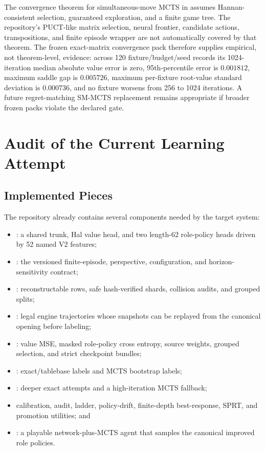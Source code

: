 \documentclass[11pt]{article}
\begin{document}
The convergence theorem for simultaneous-move MCTS in
\cite{lisy2013} assumes Hannan-consistent selection, guaranteed exploration,
and a finite game tree. The repository's PUCT-like matrix selection, neural
frontier, candidate actions, transpositions, and finite episode wrapper are not
automatically covered by that theorem. The frozen exact-matrix convergence pack
therefore supplies empirical, not theorem-level, evidence: across 120
fixture/budget/seed records its 1024-iteration median absolute value error is
zero, 95th-percentile error is \(0.001812\), maximum saddle gap is
\(0.005726\), maximum per-fixture root-value standard deviation is
\(0.000736\), and no fixture worsens from 256 to 1024 iterations. A future
regret-matching SM-MCTS replacement remains appropriate if broader frozen
packs violate the declared gate.

\section{Audit of the Current Learning Attempt}

\subsection{Implemented Pieces}

The repository already contains several components needed by the target
system:

\begin{itemize}[leftmargin=*]
  \item {}: a shared trunk, Hal value head, and two
        length-62 role-policy heads driven by 52 named V2 features;
  \item {}: the versioned finite-episode,
        perspective, configuration, and horizon-sensitivity contract;
  \item {}: reconstructable
         rows, safe hash-verified shards, collision
        audits, and grouped splits;
  \item {}: legal engine trajectories whose
        snapshots can be replayed from the canonical opening before labeling;
  \item {}: value MSE, masked role-policy cross
        entropy, source weights, grouped selection, and strict checkpoint
        bundles;
  \item {}: exact/tablebase labels and MCTS
        bootstrap labels;
  \item {}: deeper exact attempts and a
        high-iteration MCTS fallback;
  \item calibration, audit, ladder, policy-drift, finite-depth best-response,
        SPRT, and promotion utilities; and
  \item {}: a playable network-plus-MCTS agent that
        samples the canonical improved role policies.
\end{itemize}
\end{document}
